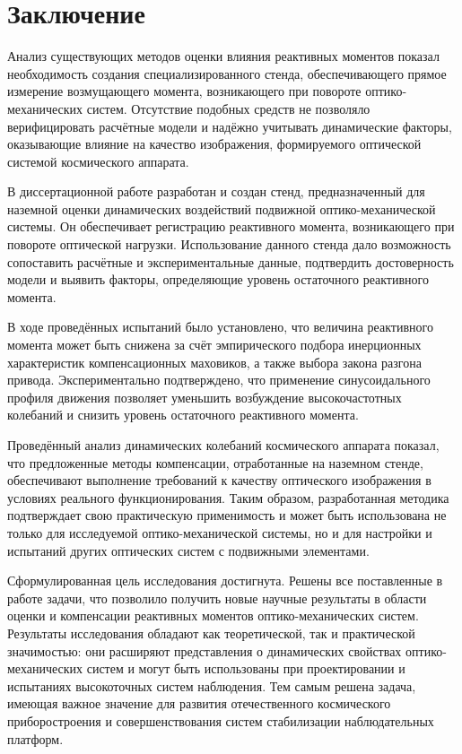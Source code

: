 \chapter*{Заключение}                       %


Анализ существующих методов оценки влияния реактивных моментов показал необходимость создания специализированного стенда, обеспечивающего прямое измерение возмущающего момента, возникающего при повороте оптико-механических систем. Отсутствие подобных средств не позволяло верифицировать расчётные модели и надёжно учитывать динамические факторы, оказывающие влияние на качество изображения, формируемого оптической системой космического аппарата.

В диссертационной работе разработан и создан стенд, предназначенный для наземной оценки динамических воздействий подвижной оптико-механической системы. Он обеспечивает регистрацию реактивного момента, возникающего при повороте оптической нагрузки. Использование данного стенда дало возможность сопоставить расчётные и экспериментальные данные, подтвердить достоверность модели и выявить факторы, определяющие уровень остаточного реактивного момента.

В ходе проведённых испытаний было установлено, что величина реактивного момента может быть снижена за счёт эмпирического подбора инерционных характеристик компенсационных маховиков, а также выбора закона разгона привода. Экспериментально подтверждено, что применение синусоидального профиля движения позволяет уменьшить возбуждение высокочастотных колебаний и снизить уровень остаточного реактивного момента. 

Проведённый анализ динамических колебаний космического аппарата показал, что предложенные методы компенсации, отработанные на наземном стенде, обеспечивают выполнение требований к качеству оптического изображения в условиях реального функционирования. Таким образом, разработанная методика подтверждает свою практическую применимость и может быть использована не только для исследуемой оптико-механической системы, но и для настройки и испытаний других оптических систем с подвижными элементами.

Сформулированная цель исследования достигнута. Решены все поставленные в работе задачи, что позволило получить новые научные результаты в области оценки и компенсации реактивных моментов оптико-механических систем. Результаты исследования обладают как теоретической, так и практической значимостью: они расширяют представления о динамических свойствах оптико-механических систем и могут быть использованы при проектировании и испытаниях высокоточных систем наблюдения. Тем самым решена задача, имеющая важное значение для развития отечественного космического приборостроения и совершенствования систем стабилизации наблюдательных платформ.